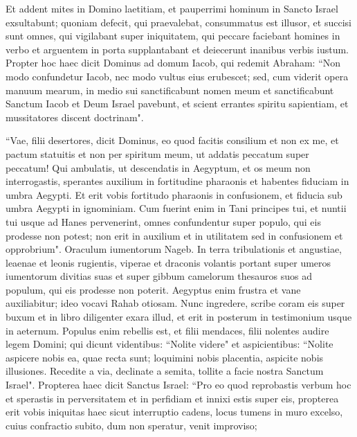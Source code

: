 \begin{biblechapter}
\verse Et addent mites in Domino laetitiam, et pauperrimi hominum in Sancto Israel exsultabunt; 
\verse quoniam defecit, qui praevalebat, consummatus est illusor, et succisi sunt omnes, qui vigilabant super iniquitatem, 
\verse qui peccare faciebant homines in verbo et arguentem in porta supplantabant et deiecerunt inanibus verbis iustum. 
\verse Propter hoc haec dicit Dominus ad domum Iacob, qui redemit Abraham: “Non modo confundetur Iacob, nec modo vultus eius erubescet; 
\verse sed, cum viderit opera manuum mearum, in medio sui sanctificabunt nomen meum et sanctificabunt Sanctum Iacob et Deum Israel pavebunt, 
\verse et scient errantes spiritu sapientiam, et mussitatores discent doctrinam".  
\end{biblechapter}

\begin{biblechapter}  
\verse “Vae, filii desertores, dicit Dominus, eo quod facitis consilium et non ex me, et pactum statuitis et non per spiritum meum, ut addatis peccatum super peccatum! 
\verse Qui ambulatis, ut descendatis in Aegyptum, et os meum non interrogastis, sperantes auxilium in fortitudine pharaonis et habentes fiduciam in umbra Aegypti. 
\verse Et erit vobis fortitudo pharaonis in confusionem, et fiducia sub umbra Aegypti in ignominiam. 
\verse Cum fuerint enim in Tani principes tui, et nuntii tui usque ad Hanes pervenerint, 
\verse omnes confundentur super populo, qui eis prodesse non potest; non erit in auxilium et in utilitatem sed in confusionem et opprobrium". 
\verse Oraculum iumentorum Nageb. In terra tribulationis et angustiae, leaenae et leonis rugientis, viperae et draconis volantis portant super umeros iumentorum divitias suas et super gibbum camelorum thesauros suos ad populum, qui eis prodesse non poterit. 
\verse Aegyptus enim frustra et vane auxiliabitur; ideo vocavi Rahab otiosam. 
\verse Nunc ingredere, scribe coram eis super buxum et in libro diligenter exara illud, et erit in posterum in testimonium usque in aeternum. 
\verse Populus enim rebellis est, et filii mendaces, filii nolentes audire legem Domini; 
\verse qui dicunt videntibus: “Nolite videre" et aspicientibus: “Nolite aspicere nobis ea, quae recta sunt; loquimini nobis placentia, aspicite nobis illusiones. 
\verse Recedite a via, declinate a semita, tollite a facie nostra Sanctum Israel". 
\verse Propterea haec dicit Sanctus Israel: “Pro eo quod reprobastis verbum hoc et sperastis in perversitatem et in perfidiam et innixi estis super eis, 
\verse propterea erit vobis iniquitas haec sicut interruptio cadens, locus tumens in muro excelso, cuius confractio subito, dum non speratur, venit improviso; 

\end{biblechapter}
